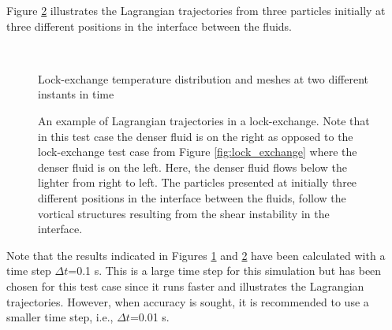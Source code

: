 Figure \ref{fig:lock_exchange_Lagrangian_trajectories} illustrates the Lagrangian trajectories from three particles initially at three different positions in the interface between the fluids.

\begin{figure}[ht]
  \centering
\begin{minipage}{1\linewidth}
\end{minipage}\\
\begin{minipage}{1\linewidth}
\vspace{0.5cm}
\end{minipage}
  \caption{Lock-exchange temperature distribution and meshes at two different instants in time}
  \label{fig:lock_exchange_Lag_traject_Temp_mesh}
\end{figure}


\begin{figure}[ht]
  \centering
\vspace*{-2.6cm}
\vspace{-2.8cm}
  \caption{An example of Lagrangian trajectories in a lock-exchange. Note that in this test case the denser fluid is on the right as opposed to the lock-exchange test case from Figure \ref{fig:lock_exchange} where the denser fluid is on the left. Here, the denser fluid flows below the lighter from right to left. The particles presented at initially three different positions in the interface between the fluids, follow the vortical structures resulting from the shear instability in the interface.}
  \label{fig:lock_exchange_Lagrangian_trajectories}
\end{figure}

Note that the results indicated in Figures \ref{fig:lock_exchange_Lag_traject_Temp_mesh} and \ref{fig:lock_exchange_Lagrangian_trajectories} have been calculated with a time step $\Delta t$=0.1 s. This is a large time step for this simulation but has been chosen for this test case since it runs faster and illustrates the Lagrangian trajectories. However, when accuracy is sought, it is recommended to use a smaller time step, i.e., $\Delta t$=0.01 s.


